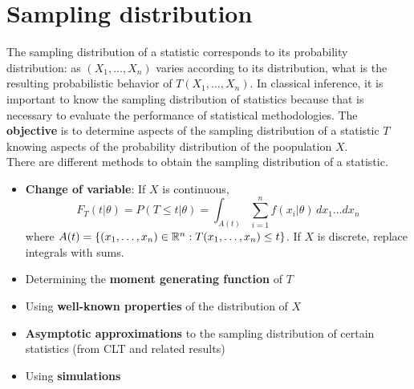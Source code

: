 \section{Sampling distribution}
The sampling distribution of a statistic corresponds to its probability distribution: as $(X_1,\ldots,X_n)$ varies according to its distribution,
what is the resulting probabilistic behavior of $T(X_1,\ldots,X_n)$. In classical inference, it is important to know the sampling distribution of statistics 
because that is necessary to evaluate the performance of statistical methodologies. The \textbf{objective} is to determine aspects of the sampling distribution
of a statistic $T$ knowing aspects of the probability distribution of the poopulation $X$.\\

There are different methods to obtain the sampling distribution of a statistic.
\begin{itemize}
    \item \textbf{Change of variable}: If $X$ is continuous,
        \begin{equation*}
            F_T(t|\theta) = P(T\leq t|\theta) = \int_{A(t)}\sum_{i=1}^{n}f(x_i|\theta)\, dx_1\ldots dx_n
        \end{equation*}
        where $A(t)=\{(x_1,\ldots,x_n)\in\mathbb{R}^n : T(x_1,\ldots,x_n)\leq t\}$. If $X$ is discrete, replace integrals with sums.
    \item Determining the \textbf{moment generating function} of $T$
    \item Using \textbf{well-known properties} of the distribution of $X$
    \item \textbf{Asymptotic approximations} to the sampling distribution of certain statistics (from CLT and related results)
    \item Using \textbf{simulations}
\end{itemize}

